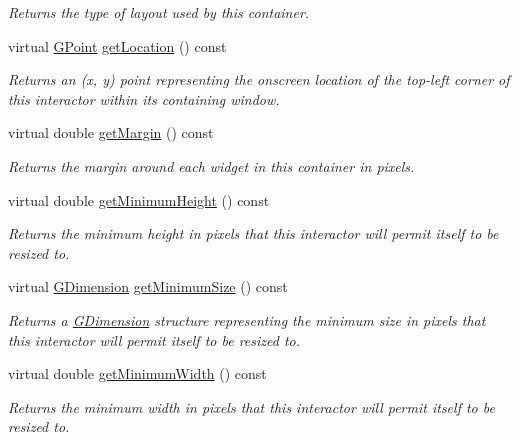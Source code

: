 \begin{DoxyCompactItemize}
\begin{DoxyCompactList}\small\item\em Returns the type of layout used by this container. \end{DoxyCompactList}\item 
virtual \mbox{\hyperlink{structsgl_1_1GPoint}{G\+Point}} \mbox{\hyperlink{classsgl_1_1GInteractor_a4f83802015511edeb63b892830812c11}{get\+Location}} () const
\begin{DoxyCompactList}\small\item\em Returns an (x, y) point representing the onscreen location of the top-\/left corner of this interactor within its containing window. \end{DoxyCompactList}\item 
virtual double \mbox{\hyperlink{classsgl_1_1GContainer_ae2b63e249b9251e1893dae87aaf4cc3d}{get\+Margin}} () const
\begin{DoxyCompactList}\small\item\em Returns the margin around each widget in this container in pixels. \end{DoxyCompactList}\item 
virtual double \mbox{\hyperlink{classsgl_1_1GInteractor_aed4b0075fcc434499c3cb3e46896bda3}{get\+Minimum\+Height}} () const
\begin{DoxyCompactList}\small\item\em Returns the minimum height in pixels that this interactor will permit itself to be resized to. \end{DoxyCompactList}\item 
virtual \mbox{\hyperlink{structsgl_1_1GDimension}{G\+Dimension}} \mbox{\hyperlink{classsgl_1_1GInteractor_a66b5af0b32493b4d597ca0a3df2049ea}{get\+Minimum\+Size}} () const
\begin{DoxyCompactList}\small\item\em Returns a \mbox{\hyperlink{structsgl_1_1GDimension}{G\+Dimension}} structure representing the minimum size in pixels that this interactor will permit itself to be resized to. \end{DoxyCompactList}\item 
virtual double \mbox{\hyperlink{classsgl_1_1GInteractor_a59e668114fe3d49d2a0f28deb258f7c8}{get\+Minimum\+Width}} () const
\begin{DoxyCompactList}\small\item\em Returns the minimum width in pixels that this interactor will permit itself to be resized to. \end{DoxyCompactList}\item 

\end{DoxyCompactItemize}
